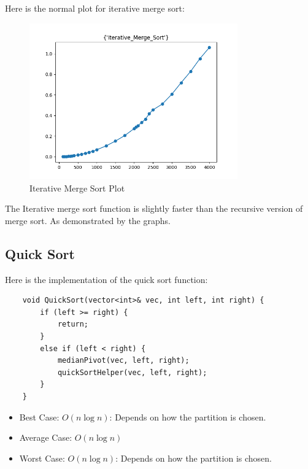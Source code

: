 \documentclass{article}
\begin{document}
Here is the normal plot for iterative merge sort:
\begin{figure}[H]
    \centering
    \includegraphics*[width=0.8\textwidth]{img/plot_Iterative_Merge_Sort.png}
    \caption{Iterative Merge Sort Plot}
\end{figure}

The Iterative merge sort function is slightly faster than the recursive version of merge sort. As demonstrated by the graphs.

\vspace{\baselineskip}
\subsection{Quick Sort}
Here is the implementation of the quick sort function:
\begin{verbatim}
    void QuickSort(vector<int>& vec, int left, int right) {
        if (left >= right) {
            return;
        }
        else if (left < right) {
            medianPivot(vec, left, right);
            quickSortHelper(vec, left, right);
        }
    }
\end{verbatim}

\begin{itemize}
    \item Best Case: $O(n \log n)$: Depends on how the partition is chosen.
    \item Average Case: $O(n \log n)$
    \item Worst Case: $O(n \log n)$: Depends on how the partition is chosen.
\end{itemize}
\end{document}
